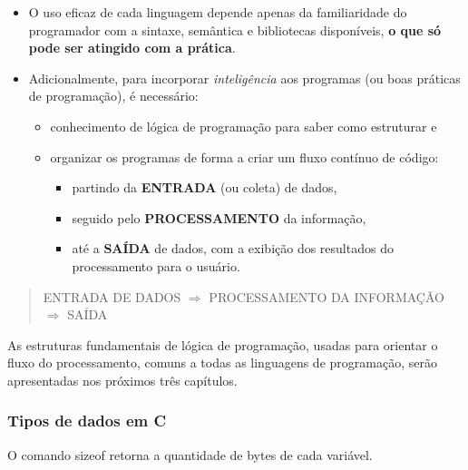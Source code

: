 \documentclass[12pt,a4paper]{article}
\providecommand{\tightlist}{%
      \setlength{\itemsep}{0pt}\setlength{\parskip}{0pt}}
\begin{document}
    \begin{itemize}
\item
  O uso eficaz de cada linguagem depende apenas da familiaridade do
  programador com a sintaxe, semântica e bibliotecas disponíveis,
  \textbf{o que só pode ser atingido com a prática}.
\item
  Adicionalmente, para incorporar \emph{inteligência} aos programas (ou
  boas práticas de programação), é necessário:

  \begin{itemize}
  \tightlist
  \item
    conhecimento de lógica de programação para saber como estruturar e
  \item
    organizar os programas de forma a criar um fluxo contínuo de código:

    \begin{itemize}
    \tightlist
    \item
      partindo da \textbf{ENTRADA} (ou coleta) de dados,
    \item
      seguido pelo \textbf{PROCESSAMENTO} da informação,
    \item
      até a \textbf{SAÍDA} de dados, com a exibição dos resultados do
      processamento para o usuário.
    \end{itemize}
  \end{itemize}
\end{itemize}

\begin{quote}
ENTRADA DE DADOS \(\Rightarrow\) PROCESSAMENTO DA INFORMAÇÃO
\(\Rightarrow\) SAÍDA
\end{quote}

    As estruturas fundamentais de lógica de programação, usadas para
orientar o fluxo do processamento, comuns a todas as linguagens de
programação, serão apresentadas nos próximos três capítulos.

    \hypertarget{tipos-de-dados-em-c}{%
\subsubsection{Tipos de dados em C}\label{tipos-de-dados-em-c}}

O comando sizeof retorna a quantidade de bytes de cada variável.
\end{document}
